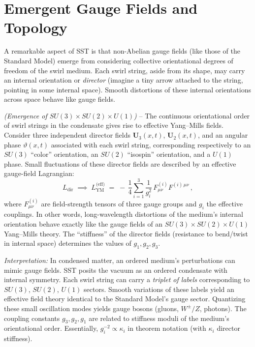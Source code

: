 \documentclass[reprint,aps,onecolumn,nofootinbib]{revtex4-2}
\begin{document}



    \section{Emergent Gauge Fields and Topology}
	A remarkable aspect of SST is that non-Abelian gauge fields (like those of the Standard Model) emerge from considering collective orientational degrees of freedom of the swirl medium. Each swirl string, aside from its shape, may carry an internal orientation or \emph{director} (imagine a tiny arrow attached to the string, pointing in some internal space). Smooth distortions of these internal orientations across space behave like gauge fields.

	\begin{tcolorbox}[title=Theorem 6.1: Emergent Yang–Mills Fields]
		\emph{(Emergence of $SU(3)\times SU(2)\times U(1)$)} – The continuous orientational order of swirl strings in the condensate gives rise to effective Yang–Mills fields. Consider three independent director fields $\mathbf{U}_3(x,t)$, $\mathbf{U}_2(x,t)$, and an angular phase $\vartheta(x,t)$ associated with each swirl string, corresponding respectively to an $SU(3)$ “color” orientation, an $SU(2)$ “isospin” orientation, and a $U(1)$ phase. Small fluctuations of these director fields are described by an effective gauge-field Lagrangian:
		\[
			L_{\text{dir}} \;\implies\; L_{\text{YM}}^{\text{(eff)}} \;=\; -\,\frac{1}{4}\sum_{i=1}^3 \frac{1}{g_i^2}\,F^{(i)}_{\mu\nu} F^{(i)\,\mu\nu}\,,
		\]
		where $F_{\mu\nu}^{(i)}$ are field-strength tensors of three gauge groups and $g_i$ the effective couplings. In other words, long-wavelength distortions of the medium’s internal orientation behave exactly like the gauge fields of an $SU(3)\times SU(2)\times U(1)$ Yang–Mills theory. The “stiffness” of the director fields (resistance to bend/twist in internal space) determines the values of $g_1, g_2, g_3$.
	\end{tcolorbox}

	\noindent \textit{Interpretation:} In condensed matter, an ordered medium’s perturbations can mimic gauge fields. SST posits the vacuum as an ordered condensate with internal symmetry. Each swirl string can carry a \emph{triplet of labels} corresponding to $SU(3)$, $SU(2)$, $U(1)$ sectors. Smooth variations of these labels yield an effective field theory identical to the Standard Model’s gauge sector. Quantizing these small oscillation modes yields gauge bosons (gluons, $W^\pm/Z$, photons). The coupling constants $g_{3}, g_{2}, g_{1}$ are related to stiffness moduli of the medium’s orientational order. Essentially, $g_i^{-2} \propto \kappa_i$ in theorem notation (with $\kappa_i$ director stiffness).
\end{document}
